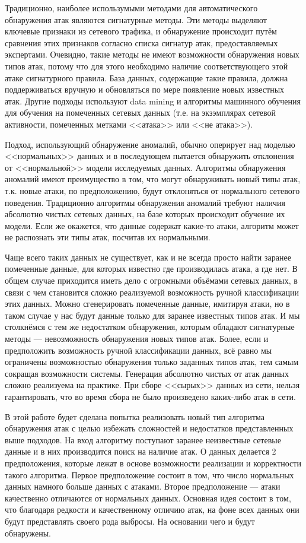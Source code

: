 Традиционно, наиболее использумыми методами для автоматического обнаружения атак являются сигнатурные методы. Эти методы выделяют ключевые признаки из сетевого трафика, и обнаружение происходит путём сравнения этих признаков согласно списка сигнатур атак, предоставляемых экспертами. Очевидно, такие методы не имеют возможности обнаружения новых типов атак, потому что для этого необходимо наличие соответствующего этой атаке сигнатурного правила. База данных, содержащие такие правила, должна поддерживаться вручную и обновляться по мере появление новых известных атак. Другие подходы используют data mining и алгоритмы машинного обучения для обучения на помеченных сетевых данных (т.е. на экзэмплярах сетевой активности, помеченных метками <<атака>> или <<не атака>>).

Подход, использующий обнаружение аномалий, обычно оперирует над моделью <<нормальных>> данных и в последующем пытается обнаружить отклонения от <<нормальной>> модели исследуемых данных. Алгоритмы обнаружения аномалий имеют преимущество в том, что могут обнаруживать новый типы атак, т.к. новые атаки, по предположению, будут отклоняться от нормального сетевого поведения. Традиционно алгоритмы обнаружения аномалий требуют наличия абсолютно чистых сетевых данных, на базе которых происходит обучение их модели. Если же окажется, что данные содержат какие-то атаки, алгоритм может не распознать эти типы атак, посчитав их нормальными.

Чаще всего таких данных не существует, как и не всегда просто найти заранее помеченные данные, для которых известно где производилась атака, а где нет. В общем случае приходится иметь дело с огромными объёмами сетевых данных, в связи с чем становится сложно реализуемой возможность ручной классификации этих данных. Можно сгенерировать помеченные данные, имитируя атаки, но в таком случае у нас будут данные только для заранее известных типов атак. И мы столкнёмся с тем же недостатком обнаружения, которым обладают сигнатурные методы --- невозможность обнаружения новых типов атак. Более, если и предположить возможность ручной классификации данных, всё равно мы ограничены возможностью обнаружения только заданных типов атак, тем самым сокращая возможности системы. Генерация абсолютно чистых от атак данных сложно реализуема на практике. При сборе <<сырых>> данных из сети, нельзя гарантировать, что во время сбора не было произведено каких-либо атак в сети.

В этой работе будет сделана попытка реализовать новый тип алгоритма обнаружения атак с целью избежать сложностей и недостатков представленных выше подходов. На вход алгоритму поступают заранее неизвестные сетевые данные и в них производится поиск на наличие атак. О данных делается 2 предположения, которые лежат в основе возможности реализации и корректности такого алгоритма. Первое предположение состоит в том, что число нормальных данных намного больше данных с атаками. Второе предположение --- атаки качественно отличаются от нормальных данных. Основная идея состоит в том, что благодаря редкости и качественному отличию атак, на фоне всех данных они будут представлять своего рода выбросы. На основании чего и будут обнаружены. 

